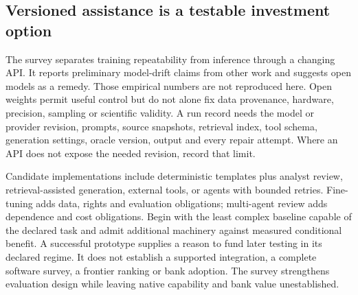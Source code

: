\subsection{Versioned assistance is a testable investment option}

The survey separates training repeatability from inference through a changing
API. It reports preliminary model-drift claims from other work and suggests
open models as a remedy. Those empirical numbers are not reproduced here.
Open weights permit useful control but do not alone fix data provenance,
hardware, precision, sampling or scientific validity. A run record needs the
model or provider revision, prompts, source snapshots, retrieval index, tool
schema, generation settings, oracle version, output and every repair attempt.
Where an API does not expose the needed revision, record that limit.
\citep{exec24_llmchallenges_original}

Candidate implementations include deterministic templates plus analyst review,
retrieval-assisted generation, external tools, or agents with bounded retries.
Fine-tuning adds data, rights and evaluation obligations; multi-agent review adds
dependence and cost obligations. Begin with the least complex baseline capable
of the declared task and admit additional machinery against measured conditional
benefit. A successful prototype supplies a reason to fund later testing in its
declared regime. It does not establish a supported integration, a complete
software survey, a frontier ranking or bank adoption. The survey strengthens
evaluation design while leaving native capability and bank value unestablished.
